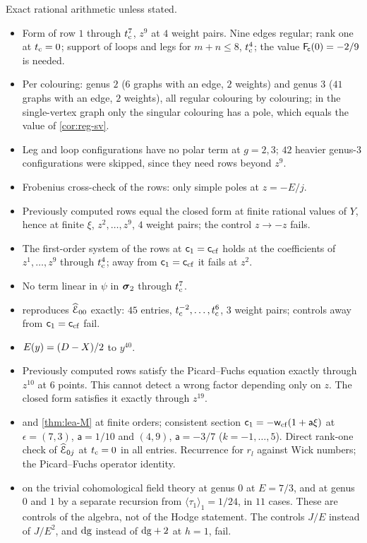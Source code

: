 Exact rational arithmetic unless stated.
\begin{itemize}
\item Form of row $1$ through $t_{\mathrm{c}}^7$, $z^9$ at $4$ weight pairs. Nine edges regular; rank one at $t_{\mathrm{c}}=0$; support of loops and legs for $m+n\leq 8$, $t_{\mathrm{c}}^4$; the value $\mathsf{F}_{\!\mathsf{c}}(0)=-2/9$ is needed.
\item Per colouring: genus $2$ ($6$ graphs with an edge, $2$ weights) and genus $3$ ($41$ graphs with an edge, $2$ weights), all regular colouring by colouring; in the single-vertex graph only the singular colouring has a pole, which equals the value of \cref{cor:reg-sv}.
\item Leg and loop configurations have no polar term at $g=2,3$; $42$ heavier genus-$3$ configurations were skipped, since they need rows beyond $z^9$.
\item Frobenius cross-check of the rows: only simple poles at $z=-E/j$.
\item Previously computed rows equal the closed form at finite rational values of $Y$, hence at finite $\xi$, $z^2,\dots,z^9$, $4$ weight pairs; the control $z\to-z$ fails.
\item The first-order system of the rows at $\mathsf{c}_{1}=\mathsf{c}_{\mathrm{cf}}$ holds at the coefficients of $z^1,\dots,z^9$ through $t_{\mathrm{c}}^4$; away from $\mathsf{c}_{1}=\mathsf{c}_{\mathrm{cf}}$ it fails at $z^2$.
\item No term linear in $\psi$ in $\boldsymbol{\sigma}_2$ through $t_{\mathrm{c}}^7$.
\item {} reproduces $\widehat{\mathcal{E}}_{00}$ exactly: $45$ entries, $t_{\mathrm{c}}^{-2},\dots,t_{\mathrm{c}}^{6}$, $3$ weight pairs; controls away from $\mathsf{c}_{1}=\mathsf{c}_{\mathrm{cf}}$ fail.
\item $E(y)=(D-X)/2$ to $y^{40}$.
\item Previously computed rows satisfy the Picard--Fuchs equation exactly through $z^{10}$ at $6$ points. This cannot detect a wrong factor depending only on $z$. The closed form satisfies it exactly through $z^{19}$.
\item {} and \cref{thm:lea-M} at finite orders; consistent section $\mathsf{c}_{1}=-\mathsf{w}_{\mathrm{cf}}(1+\mathsf{a}\xi)$ at $\epsilon=(7,3)$, $\mathsf{a}=1/10$ and $(4,9)$, $\mathsf{a}=-3/7$ ($k=-1,\dots,5$). Direct rank-one check of $\widehat{\mathcal{E}}_{0j}$ at $t_{\mathrm{c}}=0$ in all entries. Recurrence for $r_l$ against Wick numbers; the Picard--Fuchs operator identity.
\item {} on the trivial cohomological field theory at genus $0$ at $E=7/3$, and at genus $0$ and $1$ by a separate recursion from $\langle\tau_1\rangle_1=1/24$, in $11$ cases. These are controls of the algebra, not of the Hodge statement. The controls $J/E$ instead of $J/E^2$, and $\mathrm{dg}$ instead of $\mathrm{dg}+2$ at $h=1$, fail.

\end{itemize}
